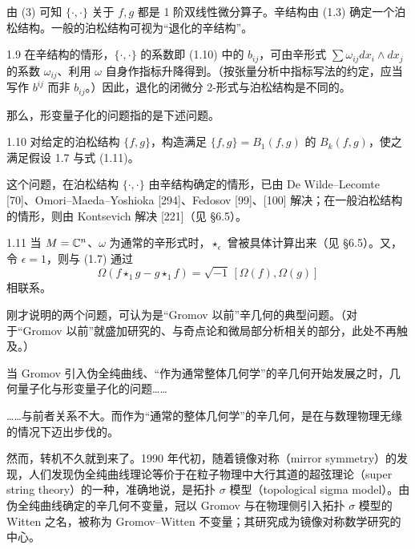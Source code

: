 由 (3) 可知 $\{\cdot,\cdot\}$ 关于 $f,g$ 都是 1 阶双线性微分算子。辛结构由 (1.3) 确定一个泊松结构。一般的泊松结构可视为“退化的辛结构”。

\begin{remark}{1.9}
  在辛结构的情形，$\{\cdot,\cdot\}$ 的系数即 (1.10) 中的 $b_{ij}$，可由辛形式 $\sum\omega_{ij}dx_i\wedge dx_j$ 的系数 $\omega_{ij}$、利用 $\omega$ 自身作指标升降得到。（按张量分析中指标写法的约定，应当写作 $b^{ij}$ 而非 $b_{ij}$。）因此，退化的闭微分 2-形式与泊松结构是不同的。
\end{remark}

那么，形变量子化的问题指的是下述问题。

\begin{problem}{1.10}
  对给定的泊松结构 $\{f,g\}$，构造满足 $\{f,g\}=B_1(f,g)$ 的 $B_k(f,g)$，使之满足假设 1.7 与式 (1.11)。
\end{problem}

这个问题，在泊松结构 $\{\cdot,\cdot\}$ 由辛结构确定的情形，已由 De Wilde–Lecomte [70]、Omori–Maeda–Yoshioka [294]、Fedosov [99]、[100] 解决；在一般泊松结构的情形，则由 Kontsevich 解决 [221]（见 §6.5）。



\begin{remark}{1.11}
  当 $M=\mathbb{C}^n$、$\omega$ 为通常的辛形式时，$\star_\epsilon$ 曾被具体计算出来（见 §6.5）。又，令 $\epsilon=1$，则与 (1.7) 通过
  \[
    \Omega(f\star_1 g-g\star_1 f)=\sqrt{-1}\,[\Omega(f),\Omega(g)]
  \]
  相联系。
\end{remark}

刚才说明的两个问题，可认为是“Gromov 以前”辛几何的典型问题。（对于“Gromov 以前”就盛加研究的、与奇点论和微局部分析相关的部分，此处不再触及。）

当 Gromov 引入伪全纯曲线、“作为通常整体几何学”的辛几何开始发展之时，几何量子化与形变量子化的问题……

……与前者关系不大。而作为“通常的整体几何学”的辛几何，是在与数理物理无缘的情况下迈出步伐的。

然而，转机不久就到来了。1990 年代初，随着镜像对称（mirror symmetry）的发现，人们发现伪全纯曲线理论等价于在粒子物理中大行其道的超弦理论（super string theory）的一种，准确地说，是拓扑 $\sigma$ 模型（topological sigma model）。由伪全纯曲线确定的辛几何不变量，冠以 Gromov 与在物理侧引入拓扑 $\sigma$ 模型的 Witten 之名，被称为 Gromov–Witten 不变量；其研究成为镜像对称数学研究的中心。

